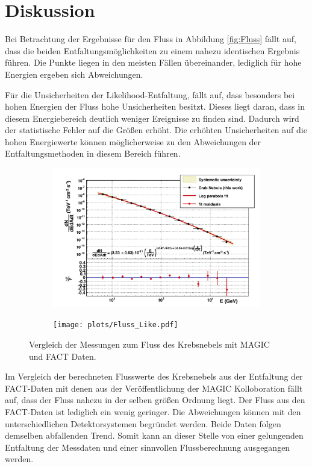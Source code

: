 \section{Diskussion}
Bei Betrachtung der Ergebnisse für den Fluss in Abbildung \ref{fig:Fluss} fällt auf, dass die beiden Entfaltungsmöglichkeiten zu einem nahezu identischen Ergebnis führen. Die Punkte liegen in den meisten Fällen übereinander, lediglich für hohe Energien ergeben sich Abweichungen.

Für die Unsicherheiten der Likelihood-Entfaltung, fällt auf, dass besonders bei hohen Energien der Fluss hohe Unsicherheiten besitzt. Dieses liegt daran, dass in diesem Energiebereich deutlich weniger Ereignisse zu finden sind. Dadurch wird der statistische Fehler auf die Größen erhöht. Die erhöhten Unsicherheiten auf die hohen Energiewerte können möglicherweise zu den Abweichungen der Entfaltungsmethoden in diesem Bereich führen.

\begin{figure}
	\begin{subfigure}[c]{0.5\textwidth}
		\includegraphics[width=\textwidth]{graphics/Magic.png}
	\end{subfigure}
	\begin{subfigure}[c]{0.5\textwidth}
		\texttt{[image: plots/Fluss\_Like.pdf]}
	\end{subfigure}
	\caption{Vergleich der Messungen zum Fluss des Krebsnebels mit MAGIC und FACT Daten.}
\end{figure}
\FloatBarrier
Im Vergleich der berechneten Flusswerte des Krebsnebels aus der Entfaltung der FACT-Daten mit denen aus der Veröffentlichung \cite{Aleksic:2014jva} der MAGIC Kolloboration fällt auf, dass der Fluss nahezu in der selben größen Ordnung liegt. Der Fluss aus den FACT-Daten ist lediglich ein wenig geringer. Die Abweichungen können mit den unterschiedlichen Detektorsystemen begründet werden. Beide Daten folgen demselben abfallenden Trend. Somit kann an dieser Stelle von einer gelungenden Entfaltung der Messdaten und einer sinnvollen Flussberechnung ausgegangen werden.
